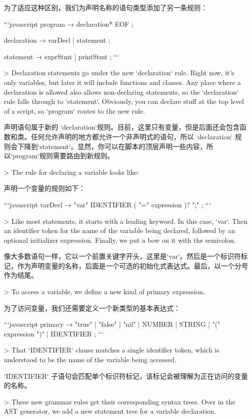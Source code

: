 \documentclass[cn,11pt,chinese]{elegantbook}
\begin{document}
{{{为了适应这种区别，我们为声明名称的语句类型添加了另一条规则：

```javascript
program        → declaration* EOF ;

declaration    → varDecl
               | statement ;

statement      → exprStmt
               | printStmt ;
```

> Declaration statements go under the new `declaration` rule. Right now, it’s only variables, but later it will include functions and classes. Any place where a declaration is allowed also allows non-declaring statements, so the `declaration` rule falls through to `statement`. Obviously, you can declare stuff at the top level of a script, so `program` routes to the new rule.

声明语句属于新的 `declaration`规则。目前，这里只有变量，但是后面还会包含函数和类。任何允许声明的地方都允许一个非声明式的语句，所以 `declaration` 规则会下降到`statement`。显然，你可以在脚本的顶层声明一些内容，所以`program`规则需要路由到新规则。

> The rule for declaring a variable looks like:

声明一个变量的规则如下：

```javascript
varDecl        → "var" IDENTIFIER ( "=" expression )? ";" ;
```

> Like most statements, it starts with a leading keyword. In this case, `var`. Then an identifier token for the name of the variable being declared, followed by an optional initializer expression. Finally, we put a bow on it with the semicolon.

像大多数语句一样，它以一个前置关键字开头，这里是`var`。然后是一个标识符标记，作为声明变量的名称，后面是一个可选的初始化式表达式。最后，以一个分号作为结尾。

> To access a variable, we define a new kind of primary expression.

为了访问变量，我们还需要定义一个新类型的基本表达式：

```javascript
primary        → "true" | "false" | "nil"
               | NUMBER | STRING
               | "(" expression ")"
               | IDENTIFIER ;
```

> That `IDENTIFIER` clause matches a single identifier token, which is understood to be the name of the variable being accessed.

 `IDENTIFIER` 子语句会匹配单个标识符标记，该标记会被理解为正在访问的变量的名称。

> These new grammar rules get their corresponding syntax trees. Over in the AST generator, we add a new statement tree for a variable declaration.

}}}
\end{document}

